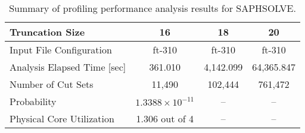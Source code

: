 \begin{table}[htbp]
    \centering
    \caption{Summary of profiling performance analysis results for SAPHSOLVE.}
    \label{tab:saphsolve_profiling}
    \begin{tabular}{|l|c|c|c|}
        \hline
        \textbf{Truncation Size} & 16 & 18 & 20 \\
        \hline
        Input File Configuration & ft-310 & ft-310 & ft-310 \\
        Analysis Elapsed Time [sec] & 361.010 & 4,142.099 & 64,365.847 \\
        Number of Cut Sets & 11,490 & 102,444 & 761,472 \\
        Probability & $1.3388 \times 10^{-11}$ & -- & -- \\
        Physical Core Utilization & 1.306 out of 4 & -- & -- \\
        \hline
    \end{tabular}
\end{table}